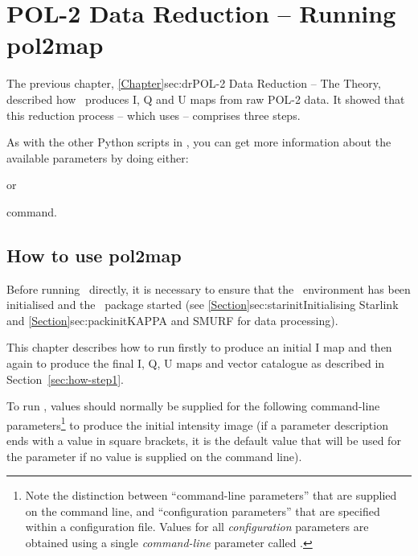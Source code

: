 \chapter{POL-2 Data Reduction -- Running
  pol2map}
\label{sec:rundr}

The previous chapter, \cref{Chapter}{sec:dr}{POL-2 Data Reduction --
  The Theory}, described how \poltwomap\ produces I, Q and U maps from raw
POL-2 data.  It showed that this reduction process -- which uses
 -- comprises three steps.

As with the other Python scripts in \SMURF, you can get more
information about the available parameters by doing either:
\begin{terminalv}
\end{terminalv}
or
\begin{terminalv}
\end{terminalv}
command.

\section{How to use pol2map}

Before running \poltwomap\ directly, it is necessary to ensure that
the \starlink\ environment has been initialised and the \smurf\
package started (see \cref{Section}{sec:starinit}{Initialising
  Starlink} and \cref{Section}{sec:packinit}{KAPPA and SMURF for data
  processing}).

This chapter describes how to run  firstly to produce an
initial I map and then again to produce the final I, Q, U maps and
vector catalogue as described in Section~\ref{sec:how-step1}.

To run , values should normally be supplied for the following
command-line parameters\footnote{Note the distinction between
  ``command-line parameters'' that are supplied on the
   command line, and ``configuration parameters'' that
  are specified within a configuration file. Values for all
  \emph{configuration} parameters are obtained using a single
  \emph{command-line} parameter called .} to produce
the initial intensity image (if a parameter description ends with a value
in square brackets, it is the default value that will be used for
the parameter if no value is supplied on the command line).

